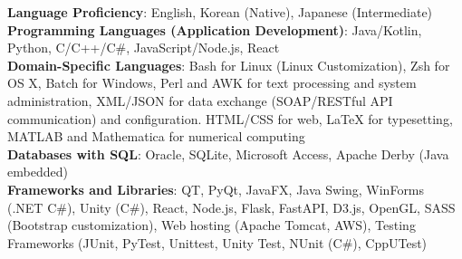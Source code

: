 \textbf{Language Proficiency}: English, Korean (Native), Japanese (Intermediate)\\
\textbf{Programming Languages (Application Development)}: Java/Kotlin, Python, C/C++/C\#, JavaScript/Node.js, React\\
\textbf{Domain-Specific Languages}: Bash for Linux (Linux Customization), Zsh for OS X, Batch for Windows, 
Perl and AWK for text processing and system administration, 
XML/JSON for data exchange (SOAP/RESTful API communication) and configuration.
HTML/CSS for web, 
LaTeX for typesetting, MATLAB and Mathematica for numerical computing\\
\textbf{Databases with SQL}: Oracle, SQLite, Microsoft Access, Apache Derby (Java embedded)\\
\textbf{Frameworks and Libraries}: 
QT, PyQt, JavaFX, Java Swing, WinForms (.NET C\#), Unity (C\#), 
React, Node.js, Flask, FastAPI, D3.js, OpenGL, 
SASS (Bootstrap customization), Web hosting (Apache Tomcat, AWS),
Testing Frameworks (JUnit, PyTest, Unittest, Unity Test, NUnit (C\#), CppUTest)\\
